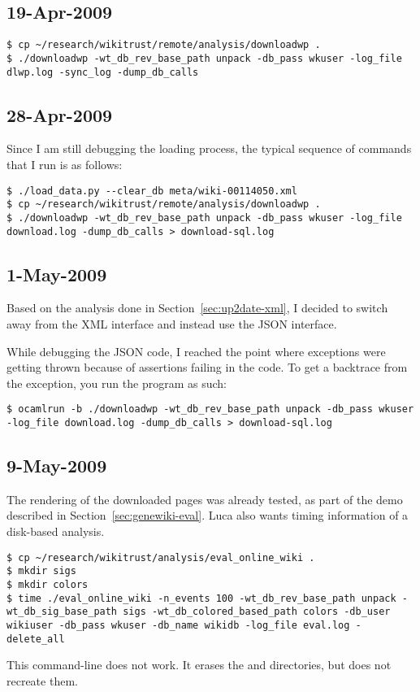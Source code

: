 \subsection{19-Apr-2009}

\begin{verbatim}
$ cp ~/research/wikitrust/remote/analysis/downloadwp .
$ ./downloadwp -wt_db_rev_base_path unpack -db_pass wkuser -log_file dlwp.log -sync_log -dump_db_calls
\end{verbatim}

\subsection{28-Apr-2009}

Since I am still debugging the loading process, the typical sequence
of commands that I run is as follows:
\begin{verbatim}
$ ./load_data.py --clear_db meta/wiki-00114050.xml
$ cp ~/research/wikitrust/remote/analysis/downloadwp .
$ ./downloadwp -wt_db_rev_base_path unpack -db_pass wkuser -log_file download.log -dump_db_calls > download-sql.log
\end{verbatim}

\subsection{1-May-2009}

Based on the analysis done in Section~\ref{sec:up2date-xml},
I decided to switch away from the XML interface and
instead use the JSON interface.

While debugging the JSON code, I reached the point where exceptions
were getting thrown because of assertions failing in the code.
To get a backtrace from the exception, you run the program as such:
\begin{verbatim}
$ ocamlrun -b ./downloadwp -wt_db_rev_base_path unpack -db_pass wkuser -log_file download.log -dump_db_calls > download-sql.log
\end{verbatim}

\subsection{9-May-2009}

The rendering of the downloaded pages was already tested,
as part of the demo described in Section~\ref{sec:genewiki-eval}.
Luca also wants timing information of a disk-based analysis.
\begin{verbatim}
$ cp ~/research/wikitrust/analysis/eval_online_wiki .
$ mkdir sigs
$ mkdir colors
$ time ./eval_online_wiki -n_events 100 -wt_db_rev_base_path unpack -wt_db_sig_base_path sigs -wt_db_colored_based_path colors -db_user wikiuser -db_pass wkuser -db_name wikidb -log_file eval.log -delete_all
\end{verbatim}
This command-line does not work.
It erases the  and  directories, but does
not recreate them.

